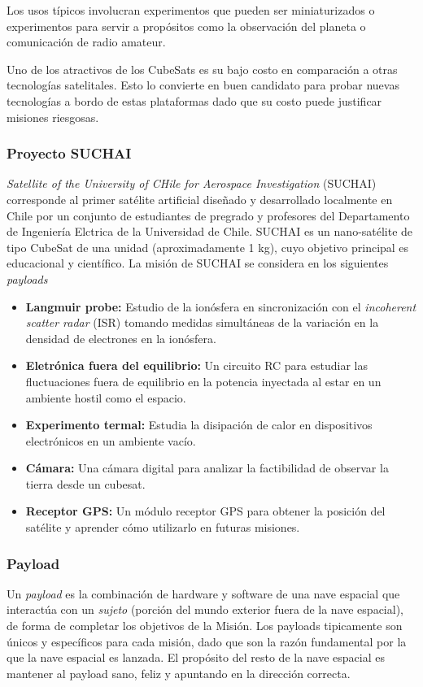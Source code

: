 Los usos típicos involucran experimentos que pueden ser miniaturizados o experimentos para servir a propósitos como la observación del planeta o comunicación de radio amateur.

Uno de los atractivos de los CubeSats es su bajo costo en comparación a otras tecnologías satelitales. Esto lo convierte en buen candidato para probar nuevas tecnologías a bordo de estas plataformas dado que su costo puede justificar misiones riesgosas.

\subsubsection{Proyecto SUCHAI}
\textit{Satellite of the University of CHile for Aerospace Investigation} (SUCHAI) corresponde al primer sat\'elite artificial diseñado y desarrollado localmente en Chile por un conjunto de estudiantes de pregrado y profesores del Departamento de Ingeniería Elctrica de la Universidad de Chile.
SUCHAI es un nano-sat\'elite de tipo CubeSat de una unidad (aproximadamente 1 kg), cuyo objetivo principal es educacional y científico.
La misión de SUCHAI se considera en los siguientes \textit{payloads}
\begin{itemize}
	\item \textbf{Langmuir probe: } Estudio de la ionósfera en sincronización con el \textit{incoherent scatter radar} (ISR) tomando medidas simultáneas de la variación en la densidad de electrones en la ionósfera.
	\item \textbf{Eletrónica fuera del equilibrio: } Un circuito RC para estudiar las fluctuaciones fuera de equilibrio en la potencia inyectada al estar en un ambiente hostil como el espacio.
	\item \textbf{Experimento termal: } Estudia la disipación de calor en dispositivos electrónicos en un ambiente vacío.
	\item \textbf{Cámara: } Una cámara digital para analizar la factibilidad de observar la tierra desde un cubesat.
	\item \textbf{Receptor GPS: } Un módulo receptor GPS para obtener la posición del sat\'elite y aprender cómo utilizarlo en futuras misiones.
\end{itemize}

\subsubsection{Payload}
Un \textit{payload} es la combinación de hardware y software de una nave espacial que interactúa con un \textit{sujeto} (porción del mundo exterior fuera de la nave espacial), de forma de completar los objetivos de la Misión. Los payloads tipicamente son únicos y específicos para cada misión, dado que son la razón fundamental por la que la nave espacial es lanzada. El propósito del resto de la nave espacial es mantener al payload sano, feliz y apuntando en la dirección correcta.
